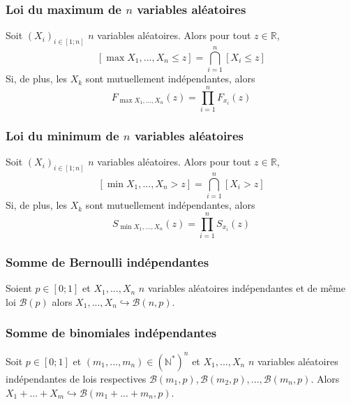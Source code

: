         \subsubsection{Loi du maximum de $n$ variables aléatoires}
            Soit $(X_i)_{i \in [1; n]}$ $n$ variables aléatoires. Alors pour tout $z \in \mathbb{R}$,
            \[
                [\max{X_1, ..., X_n} \leq z] = \bigcap_{i = 1}^{n} [X_i \leq z]
            \]
            Si, de plus, les $X_k$ sont mutuellement indépendantes, alors
            \[
                F_{\max{X_1, ..., X_n}}(z) = \prod_{i = 1}^{n} F_{x_i}(z)
            \]

        \subsubsection{Loi du minimum de $n$ variables aléatoires}
            Soit $(X_i)_{i \in [1; n]}$ $n$ variables aléatoires. Alors pour tout $z \in \mathbb{R}$,
            \[
                [\min{X_1, ..., X_n} > z] = \bigcap_{i = 1}^{n} [X_i > z]
            \]
            Si, de plus, les $X_k$ sont mutuellement indépendantes, alors
            \[
                S_{\min{X_1, ..., X_n}}(z) = \prod_{i = 1}^{n} S_{x_i}(z)
            \]
        
        \subsubsection{Somme de Bernoulli indépendantes}
            Soient $p \in [0; 1]$ et $X_1, ..., X_n$ $n$ variables aléatoires indépendantes et de même
            loi $\mathcal{B}(p)$ alors $X_1, ..., X_n \hookrightarrow \mathcal{B}(n,p)$.

        \subsubsection{Somme de binomiales indépendantes}
            Soit $p \in [0; 1]$ et $(m_1, ..., m_n) \in (\mathbb{N}^{*})^n$ et $X_1, ..., X_n$ $n$
            variables aléatoires indépendantes de lois respectives $\mathcal{B}(m_1,p), \mathcal{B}(m_2,p), ...,
            \mathcal{B}(m_n,p)$. Alors $X_1 + ... + X_m \hookrightarrow \mathcal{B}(m_1 + ... + m_n, p)$.

